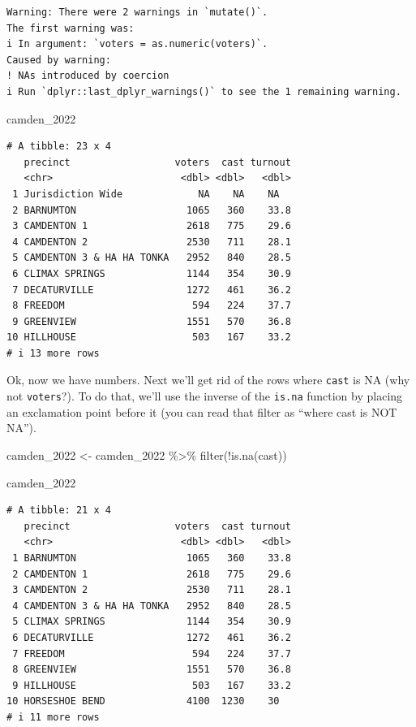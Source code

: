 \documentclass[
  letterpaper,
  DIV=11,
  numbers=noendperiod]{scrreprt}
\newenvironment{Shaded}{\begin{snugshade}}{\end{snugshade}}
\newcommand{\FunctionTok}[1]{\textcolor[rgb]{0.28,0.35,0.67}{#1}}
\newcommand{\NormalTok}[1]{\textcolor[rgb]{0.00,0.23,0.31}{#1}}
\newcommand{\OtherTok}[1]{\textcolor[rgb]{0.00,0.23,0.31}{#1}}
\newcommand{\SpecialCharTok}[1]{\textcolor[rgb]{0.37,0.37,0.37}{#1}}
\begin{document}
\begin{verbatim}
Warning: There were 2 warnings in `mutate()`.
The first warning was:
i In argument: `voters = as.numeric(voters)`.
Caused by warning:
! NAs introduced by coercion
i Run `dplyr::last_dplyr_warnings()` to see the 1 remaining warning.
\end{verbatim}

\begin{Shaded}
\begin{Highlighting}[]
\NormalTok{camden\_2022}
\end{Highlighting}
\end{Shaded}

\begin{verbatim}
# A tibble: 23 x 4
   precinct                  voters  cast turnout
   <chr>                      <dbl> <dbl>   <dbl>
 1 Jurisdiction Wide             NA    NA    NA  
 2 BARNUMTON                   1065   360    33.8
 3 CAMDENTON 1                 2618   775    29.6
 4 CAMDENTON 2                 2530   711    28.1
 5 CAMDENTON 3 & HA HA TONKA   2952   840    28.5
 6 CLIMAX SPRINGS              1144   354    30.9
 7 DECATURVILLE                1272   461    36.2
 8 FREEDOM                      594   224    37.7
 9 GREENVIEW                   1551   570    36.8
10 HILLHOUSE                    503   167    33.2
# i 13 more rows
\end{verbatim}

Ok, now we have numbers. Next we'll get rid of the rows where
\texttt{cast} is NA (why not \texttt{voters}?). To do that, we'll use
the inverse of the \texttt{is.na} function by placing an exclamation
point before it (you can read that filter as ``where cast is NOT NA'').

\begin{Shaded}
\begin{Highlighting}[]
\NormalTok{camden\_2022 }\OtherTok{\textless{}{-}}\NormalTok{ camden\_2022 }\SpecialCharTok{\%\textgreater{}\%} \FunctionTok{filter}\NormalTok{(}\SpecialCharTok{!}\FunctionTok{is.na}\NormalTok{(cast))}

\NormalTok{camden\_2022}
\end{Highlighting}
\end{Shaded}

\begin{verbatim}
# A tibble: 21 x 4
   precinct                  voters  cast turnout
   <chr>                      <dbl> <dbl>   <dbl>
 1 BARNUMTON                   1065   360    33.8
 2 CAMDENTON 1                 2618   775    29.6
 3 CAMDENTON 2                 2530   711    28.1
 4 CAMDENTON 3 & HA HA TONKA   2952   840    28.5
 5 CLIMAX SPRINGS              1144   354    30.9
 6 DECATURVILLE                1272   461    36.2
 7 FREEDOM                      594   224    37.7
 8 GREENVIEW                   1551   570    36.8
 9 HILLHOUSE                    503   167    33.2
10 HORSESHOE BEND              4100  1230    30  
# i 11 more rows
\end{verbatim}
\end{document}
